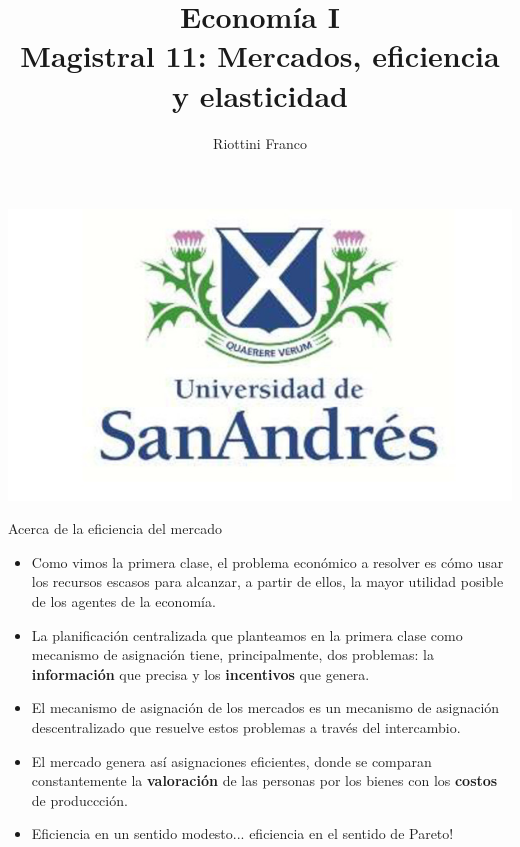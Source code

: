 \documentclass{beamer}
\title[Economía I]{Economía I \vspace{4mm}
\\ Magistral 11: Mercados, eficiencia y elasticidad}
\date{}
\author[Franco Riottini]{Riottini Franco}
\institute[]{Universidad de San Andrés}
\begin{document}
\begin{frame}
\titlepage
\centering
\includegraphics[scale=0.2]{../Figures/logoUDESA.jpg} 
\end{frame}

\begin{frame}{Acerca de la eficiencia del mercado}
    \begin{itemize}
      \item Como vimos la primera clase, el problema económico a resolver es cómo usar los recursos escasos para alcanzar, a partir de ellos, la mayor utilidad posible de los agentes de la economía.
      \item La planificación centralizada que planteamos en la primera clase como mecanismo de asignación tiene, principalmente, dos problemas: la \textbf{información} que precisa y los \textbf{incentivos} que genera.
      \item El mecanismo de asignación de los mercados es un mecanismo de asignación descentralizado que resuelve estos problemas a través del intercambio.
      \item El mercado genera así asignaciones eficientes, donde se comparan constantemente la \textbf{valoración} de las personas por los bienes con los \textbf{costos} de produccción.
      \item Eficiencia en un sentido modesto... eficiencia en el sentido de Pareto!
    \end{itemize}
\end{frame}
\end{document}
